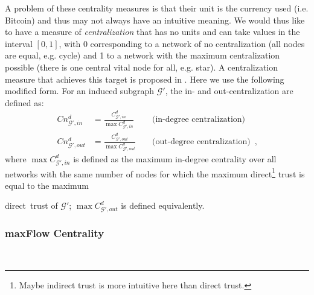     A problem of these centrality measures is that their unit is the currency used (i.e. Bitcoin) and thus may not always have
    an intuitive meaning. We would thus like to have a measure of \textit{centralization} that has no units and can take
    values in the interval $\left[0,1\right]$, with 0 corresponding to a network of no centralization (all nodes are equal,
    e.g.  cycle) and 1 to a network with the maximum centralization possible (there is one central vital node for all, e.g.
    star). A centralization measure that achieves this target is proposed in \cite{freeman}. Here we use the following
    modified form. For an induced subgraph $\mathcal{G}'$, the in- and out-centralization are defined as:
    \begin{align*}
      Cn^d_{\mathcal{G}', in} &= \frac{C^d_{\mathcal{G}', in}}{\max C^d_{\mathcal{G}', in}} && \mbox{ (in-degree
      centralization)} \\
      Cn^d_{\mathcal{G}', out} &= \frac{C^d_{\mathcal{G}', out}}{\max C^d_{\mathcal{G}', out}} && \mbox{ (out-degree
      centralization)} \enspace,
    \end{align*}
    where $\max C^d_{\mathcal{G}', in}$ is defined as the maximum in-degree centrality over all networks with the same number
    of nodes for which the maximum direct\footnote{Maybe indirect trust is more intuitive here than direct trust.} trust is
    equal to the maximum \addtocounter{footnote}{-1}direct\footnotemark \ trust of $\mathcal{G}'$; $\max C^d_{\mathcal{G}',
    out}$ is defined equivalently.

  \subsubsection{maxFlow Centrality} \ \\

